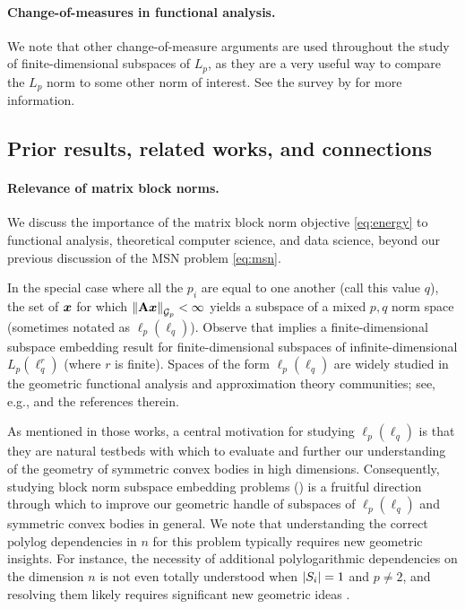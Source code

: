 \documentclass[11pt]{article}
\numberwithin{equation}{section}
\begin{document}
\paragraph{Change-of-measures in functional analysis.} We note that other change-of-measure arguments are used throughout the study of finite-dimensional subspaces of $L_p$, as they are a very useful way to compare the $L_p$ norm to some other norm of interest. See the survey by \citet[Section 1.2]{js01} for more information.

\subsection{Prior results, related works, and connections}
\label{sec:related_works}

\paragraph{Relevance of matrix block norms.} We discuss the importance of the matrix block norm objective \eqref{eq:energy} to functional analysis, theoretical computer science, and data science, beyond our previous discussion of the MSN problem \eqref{eq:msn}.

In the special case where all the $p_i$ are equal to one another (call this value $q$), the set of $\bm{x}$ for which $\left\lVert \mathbf{A}\bm{x} \right\rVert_{\mathcal{G}_{p}} < \infty$ yields a subspace of a mixed $p,q$ norm space (sometimes notated as $\ell_p(\ell_q)$). Observe that  implies a finite-dimensional subspace embedding result for finite-dimensional subspaces of infinite-dimensional $L_p(\ell_q^r)$ (where $r$ is finite).  Spaces of the form $\ell_p(\ell_q)$ are widely studied in the geometric functional analysis and approximation theory communities; see, e.g., \cite{ps12,kv15,mu19,jkb22} and the references therein. 

As mentioned in those works, a central motivation for studying $\ell_p(\ell_q)$ is that they are natural testbeds with which to evaluate and further our understanding of the geometry of symmetric convex bodies in high dimensions. Consequently, studying block norm subspace embedding problems () is a fruitful direction through which to improve our geometric handle of subspaces of $\ell_p(\ell_q)$ and symmetric convex bodies in general. We note that understanding the correct $\mathrm{polylog}$ dependencies in $n$ for this problem typically requires new geometric insights. For instance, the necessity of additional polylogarithmic dependencies on the dimension $n$ is not even totally understood when $\left\lvert S_i \right\rvert = 1$ and $p\neq 2$, and resolving them likely requires significant new geometric ideas \cite[Conjecture 2]{hrr22}. 
\end{document}
